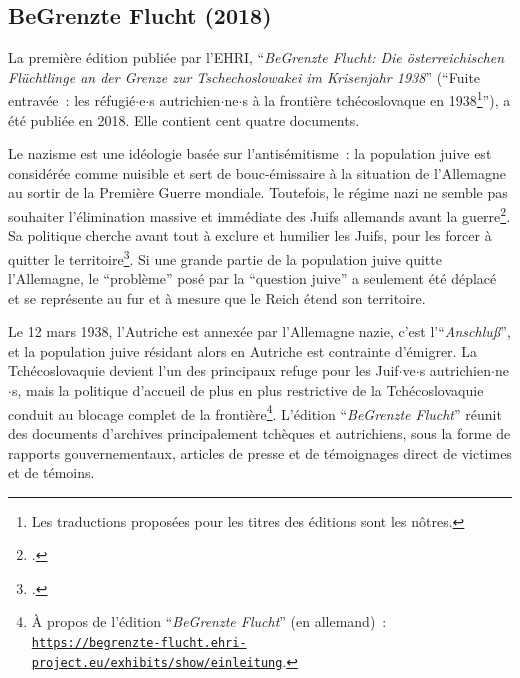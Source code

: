 \subsection{BeGrenzte Flucht (2018)}
La première édition publiée par l'EHRI, \enquote{\textit{BeGrenzte Flucht: Die österreichischen Flüchtlinge an der Grenze zur Tschechoslowakei im Krisenjahr 1938}} (\enquote{Fuite entravée~: les réfugié$\cdot$e$\cdot$s autrichien$\cdot$ne$\cdot$s à la frontière tchécoslovaque en 1938\footnote{Les traductions proposées pour les titres des éditions sont les nôtres.}}), a été publiée en 2018. Elle contient cent quatre documents.  

Le nazisme est une idéologie basée sur l'antisémitisme~: la population juive est considérée comme nuisible et sert de bouc-émissaire à la situation de l'Allemagne au sortir de la Première Guerre mondiale. Toutefois, le régime nazi ne semble pas souhaiter l'élimination massive et immédiate des Juifs allemands avant la guerre\footcite[p.~123]{Sallee2018}{}. Sa politique cherche avant tout à exclure et humilier les Juifs, pour les forcer à quitter le territoire\footcite[p.~22]{Bensoussan2020}. Si une grande partie de la population juive quitte l'Allemagne, le \enquote{problème} posé par la \enquote{question juive} a seulement été déplacé et se représente au fur et à mesure que le Reich étend son territoire.  

Le 12 mars 1938, l'Autriche est annexée par l'Allemagne nazie, c'est l'\enquote{\textit{Anschlu\ss{}}}, et la population juive résidant alors en Autriche est contrainte d'émigrer. La Tchécoslovaquie devient l'un des principaux refuge pour les Juif$\cdot$ve$\cdot$s autrichien$\cdot$ne$\cdot$s, mais la politique d'accueil de plus en plus restrictive de la Tchécoslovaquie conduit au blocage complet de la frontière\footnote{À propos de l'édition \enquote{\textit{BeGrenzte Flucht}} (en allemand)~: \texttt{\href{https://begrenzte-flucht.ehri-project.eu/exhibits/show/einleitung}{https://begrenzte-flucht.ehri-project.eu/exhibits/show/einleitung}}.}. L'édition \enquote{\textit{BeGrenzte Flucht}} réunit des documents d'archives principalement tchèques et autrichiens, sous la forme de rapports gouvernementaux, articles de presse et de témoignages direct de victimes et de témoins.  

